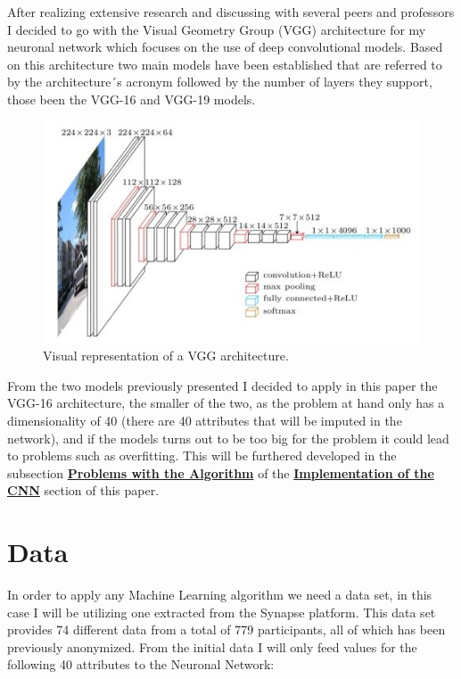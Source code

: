 \documentclass[12pt, a4paper]{article}
\begin{document}
	After realizing extensive research and discussing with several peers and professors I decided to go with the Visual Geometry Group (VGG) architecture for my neuronal network which focuses on the use of deep convolutional models. Based on this architecture two main models have been established that are referred to by the architecture´s acronym followed by the number of layers they support, those been the VGG-16 and VGG-19 models.\cite{VGGinfo}
	
	\vspace{5mm}
	\begin{figure}[h]
		\label{VGGArchitecture}
		\includegraphics[width=150mm]{img/vgg-neural-network-architecture.jpg}
		\caption{Visual representation of a VGG architecture. \cite{VGGimg}}
	\end{figure}
	\vspace{5mm}

	From the two models previously presented I decided to apply in this paper the VGG-16 architecture, the smaller of the two, as the problem at hand only has a dimensionality of 40 (there are 40 attributes that will be imputed in the network), and if the models turns out to be too big for the problem it could lead to problems such as overfitting. This will be furthered developed in the subsection \hyperref[sec:ProblemsWithAlgorithm]{\textbf{Problems with the Algorithm}} of the \hyperref[sec:CNNImplementation]{\textbf{Implementation of the CNN}} section of this paper.
	
	
	\clearpage
	
	\section{Data}
	\label{sec:Data}
	
	In order to apply any Machine Learning algorithm we need a data set, in this case I will be utilizing one extracted from the Synapse platform. This data set provides 74 different data from a total of 779 participants, all of which has been previously anonymized. From the initial data I will only feed values for the following 40 attributes to the Neuronal Network:
	
\end{document}
